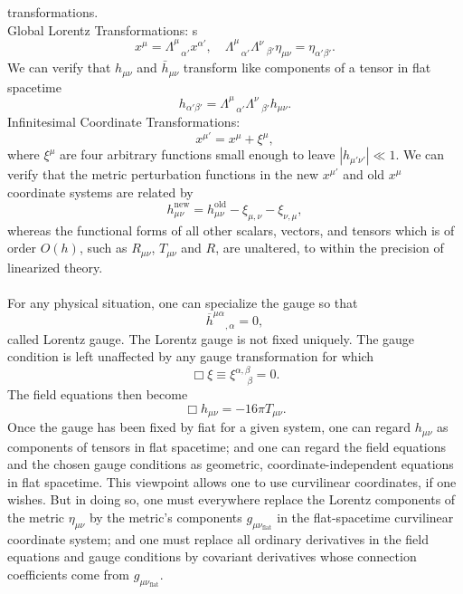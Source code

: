 transformations.
\\
Global Lorentz Transformations:
s\\
\[x^{\mu} = \Lambda^{\mu}_{\phantom{*}\alpha'}x^{\alpha'} , \quad \Lambda^{\mu}_{\phantom{*}\alpha'} \Lambda^{\nu}_{\phantom{*}\beta'} \eta_{\mu\nu} = \eta_{\alpha'\beta'} .\]
We can verify that $h_{\mu\nu}$ and $\bar{h}_{\mu\nu}$
transform like components of a tensor in flat spacetime
\[h_{\alpha'\beta'} = \Lambda^{\mu}_{\phantom{*}\alpha'} \Lambda^{\nu}_{\phantom{*}\beta'} h_{\mu\nu}.\]
Infinitesimal Coordinate Transformations:
\\
\[x^{\mu'} = x^{\mu} + \xi^{\mu},\]
where $\xi^{\mu}$ are four arbitrary functions small enough to leave $|h_{\mu'\nu'}| \ll 1$. We can verify that the metric perturbation functions in the new $x^{\mu'}$ and old $x^{\mu}$ coordinate systems are related by
\[h_{\mu\nu}^{\mathrm{new}} = h_{\mu\nu}^{\mathrm{old}} - \xi_{\mu,\nu} - \xi_{\nu,\mu},\]
whereas the functional forms of all other scalars, vectors, and tensors which is of order $O(h)$, such as $R_{\mu\nu}$, $T_{\mu\nu}$ and $R$, are unaltered, to within the precision of linearized theory. 
\\ \\
For any physical situation, one can specialize the gauge so that
\[\overline{h}^{\mu\alpha}_{\phantom{**},\alpha} = 0,\] 
called Lorentz gauge. 
The Lorentz gauge is not fixed uniquely. The gauge condition is left unaffected by any gauge transformation for which
\[\Box \xi \equiv \xi^{\alpha,\beta}_{\phantom{**}\beta} = 0.\]
The field equations then become
\[\Box h_{\mu\nu} = -16\pi T_{\mu\nu}.\]
Once the gauge has been fixed by fiat for a given system, one can regard $h_{\mu\nu}$ as components of tensors in flat spacetime; and one can regard the field equations and the chosen gauge conditions as geometric, coordinate-independent equations in flat spacetime.
This viewpoint allows one to use curvilinear coordinates, if one wishes. But in doing so, one must everywhere replace the Lorentz components of the metric $\eta_{\mu\nu}$ by the metric's components $g_{\mu\nu_{\mathrm{flat}}}$ in the flat-spacetime curvilinear coordinate system; and one must replace all ordinary derivatives in the field equations and gauge conditions by covariant derivatives whose connection coefficients come from $g_{\mu\nu_{\mathrm{flat}}}$.

